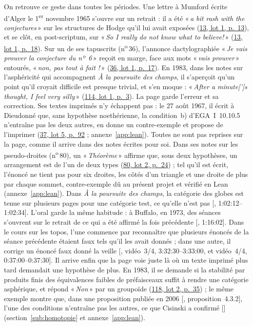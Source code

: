 \documentclass[11pt]{amsart}
\makeatletter
\newcommand{\ts}[1]{\foreignlanguage{english}{#1}}
\newcommand{\q}[1]{«\,\textit{#1}\,»}
\newcommand{\cote}[1]{\mbox{n\textsuperscript{o}\,#1}}
\def\RHM@first#1--#2\@nil{#1}
\DeclareRobustCommand{\lot}[3]{\begingroup\edef\RHM@pdfpage{\the\numexpr\RHM@first#3--\@nil+1\relax}\href{https://grothendieck.umontpellier.fr/#1.pdf\#page=\RHM@pdfpage}{#1, lot #2, p.~#3}\endgroup}
\newcommand{\lot}[3]{\href{https://grothendieck.commutator.io/\##1/#2/p#3}{#1, lot #2, p.~#3}}
\newcommand{\moanswer}{\citealp{cisinski2026mo}}
\makeatother
\begin{document}
On retrouve ce geste dans toutes les périodes. Une lettre à Mumford écrite d'Alger le 1\textsuperscript{er} novembre 1965 s'ouvre sur un retrait : il a été \q{a bit rash with the conjectures} sur les structures de Hodge qu'il lui avait exposées (\lot{13}{1}{13}), et se clôt, en post-scriptum, sur \q{So I really do not know what to believe!} (\lot{13}{1}{18}). Sur un de ses tapuscrits (\cote{36}), l'annonce dactylographiée \q{Je vais prouver la conjecture du nº~6} reçoit en marge, face aux mots \q{vais prouver} entourés, \q{non, pas tout à fait !} (\lot{36}{1}{17}). En 1983, dans les notes sur l'asphéricité qui accompagnent \emph{À la poursuite des champs}, il s'aperçoit qu'un point qu'il croyait difficile est presque trivial, et s'en moque : \q{After a minute[']s thought, I feel very silly} (\lot{114}{1}{3}). La page garde l'erreur et sa correction. Ses textes imprimés n'y échappent pas : le 27 août 1967, il écrit à Dieudonné que, sans hypothèse noethérienne, la condition~b) d'EGA~I~10.10.5 n'entraîne pas les deux autres, en donne un contre-exemple et propose de l'imprimer (\lot{37}{5}{92} ; annexe~\ref{app:lean}). Toutes ne sont pas reprises sur la page, comme il arrive dans des notes écrites pour soi. Dans ses notes sur les pseudo-droites (\cote{80}), un \q{Théorème} affirme que, sous deux hypothèses, un arrangement est de l'un de deux types (\lot{80}{2}{24}) ; tel qu'il est écrit, l'énoncé ne tient pas pour six droites, les côtés d'un triangle et une droite de plus par chaque sommet, contre-exemple dû au présent projet et vérifié en Lean (annexe~\ref{app:lean}). Dans \emph{À la poursuite des champs}, la catégorie des globes est tenue sur plusieurs pages pour une catégorie test, ce qu'elle n'est pas [\citealp{maltsiniotis2018}, \ts{1:02:12--1:02:34}]. L'oral garde la même habitude : à Buffalo, en 1973, des séances s'ouvrent sur le retrait de ce qui a été affirmé la fois précédente [\citealp{mclarty2018}, \ts{1:16:02}]. Dans le cours sur les topos, l'une commence par reconnaître que plusieurs énoncés de la séance précédente étaient faux tels qu'il les avait donnés ; dans une autre, il corrige un énoncé faux donné la veille [\citealp{buffalo1973topos}, vidéo~3/4, \ts{3:32:30--3:33:00}, et vidéo~4/4, \ts{0:37:00--0:37:30}]. Il arrive enfin que la page voie juste là où un texte imprimé plus tard demandait une hypothèse de plus. En 1983, il se demande si la stabilité par produits finis des équivalences faibles de préfaisceaux suffit à rendre une catégorie asphérique, et répond \q{Non} par un groupoïde (\lot{118}{2}{35}) ; le même exemple montre que, dans une proposition publiée en 2006 [\citealp{cisinski2006}, proposition~4.3.2], l'une des conditions n'entraîne pas les autres, ce que Cisinski a confirmé [\moanswer] (section~\ref{sub:homotopie} et annexe~\ref{app:lean}).
\end{document}
